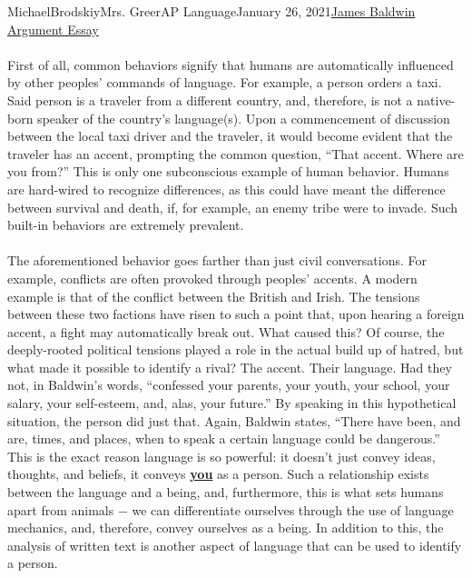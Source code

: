 \documentclass[12pt,letterpaper]{article}
\begin{document}
\begin{mla}{Michael}{Brodskiy}{Mrs. Greer}{AP Language}{January 26, 2021}{\underline{James Baldwin Argument Essay}}
\begin{justify}
  \end{justify}

  \begin{justify}

    \paragraph{} First of all, common behaviors signify that humans are automatically influenced by other peoples' commands of language. For example, a person orders a taxi. Said person is a traveler from a different country, and, therefore, is not a native-born speaker of the country's language(s). Upon a commencement of discussion between the local taxi driver and the traveler, it would become evident that the traveler has an accent, prompting the common question, ``That accent. Where are you from?'' This is only one subconscious example of human behavior. Humans are hard-wired to recognize differences, as this could have meant the difference between survival and death, if, for example, an enemy tribe were to invade. Such built-in behaviors are extremely prevalent. \\

  \end{justify}

  \begin{justify}

    \paragraph{} The aforementioned behavior goes farther than just civil conversations. For example, conflicts are often provoked through peoples' accents. A modern example is that of the conflict between the British and Irish. The tensions between these two factions have risen to such a point that, upon hearing a foreign accent, a fight may automatically break out. What caused this? Of course, the deeply-rooted political tensions played a role in the actual build up of hatred, but what made it possible to identify a rival? The accent. Their language. Had they not, in Baldwin's words, ``confessed your parents, your youth, your school, your salary, your self-esteem, and, alas, your future.'' By speaking in this hypothetical situation, the person did just that. Again, Baldwin states, ``There have been, and are, times, and places, when to speak a certain language could be dangerous.'' This is the exact reason language is so powerful: it doesn't just convey ideas, thoughts, and beliefs, it conveys \underline{\textbf{you}} as a person. Such a relationship exists between the language and a being, and, furthermore, this is what sets humans apart from animals $-$ we can differentiate ourselves through the use of language mechanics, and, therefore, convey ourselves as a being. In addition to this, the analysis of written text is another aspect of language that can be used to identify a person.\\


\end{justify}
\end{mla}
\end{document}
